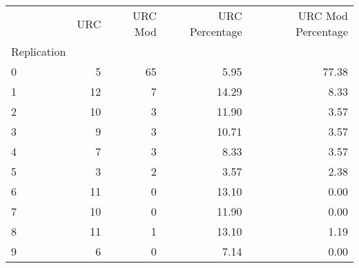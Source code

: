 \begin{tabular}{lrrrr}
\toprule
 & URC & URC Mod & URC Percentage & URC Mod Percentage \\
Replication &  &  &  &  \\
\midrule
0 & 5 & 65 & 5.95 & 77.38 \\
1 & 12 & 7 & 14.29 & 8.33 \\
2 & 10 & 3 & 11.90 & 3.57 \\
3 & 9 & 3 & 10.71 & 3.57 \\
4 & 7 & 3 & 8.33 & 3.57 \\
5 & 3 & 2 & 3.57 & 2.38 \\
6 & 11 & 0 & 13.10 & 0.00 \\
7 & 10 & 0 & 11.90 & 0.00 \\
8 & 11 & 1 & 13.10 & 1.19 \\
9 & 6 & 0 & 7.14 & 0.00 \\
\bottomrule
\end{tabular}
